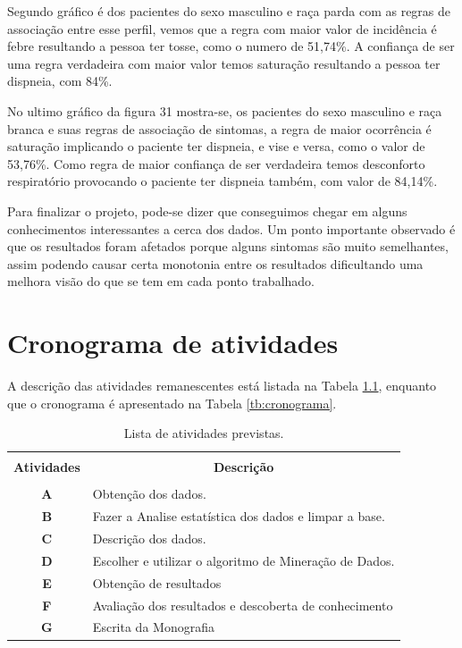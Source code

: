 \documentclass[tcc1]{uftex}
\begin{document}
    Segundo gráfico é dos pacientes do sexo masculino e raça parda com as regras de associação entre esse perfil, vemos que a regra com maior valor de incidência é febre resultando a pessoa ter tosse, como o numero de 51,74\%. A confiança de ser uma regra verdadeira com maior valor temos saturação resultando a pessoa ter dispneia, com 84\%.
    
    No ultimo gráfico da figura 31 mostra-se, os pacientes do sexo masculino e raça branca e suas regras de associação de sintomas, a regra de maior ocorrência é saturação implicando o paciente ter dispneia, e vise e versa, como o valor de 53,76\%. Como regra de maior confiança de ser verdadeira temos desconforto respiratório provocando o paciente ter dispneia também, com valor de 84,14\%.
    
    
    
    Para finalizar o projeto, pode-se dizer que conseguimos chegar em alguns conhecimentos interessantes a cerca dos dados. Um ponto importante observado é que os resultados foram afetados porque alguns sintomas são muito semelhantes, assim podendo causar certa monotonia entre os resultados dificultando uma melhora visão do que se tem em cada ponto trabalhado.

\chapter{Cronograma de atividades}
A descrição das atividades remanescentes está listada na Tabela \ref{tb:atividades}, enquanto que o cronograma é apresentado na Tabela \ref{tb:cronograma}.


\begin{table}[!h]
  \centering
  \caption{Lista de atividades previstas.}\label{tb:atividades}
  \begin{tabular}{cp{9.4cm}}
    \hline \hline &\\[-0.4cm]
    {\bf Atividades} & \multicolumn{1}{c}{\bf Descrição} \\
    \hline
    &\\[-0.4cm]
    \textbf{A} & Obtenção dos dados.\\[0.2cm]
    \textbf{B} & Fazer a Analise estatística dos dados e limpar a base.\\[0.2cm]
    \textbf{C} & Descrição dos dados.\\[0.2cm]
    \textbf{D} & Escolher e utilizar o algoritmo de Mineração de Dados.\\[0.2cm]
    \textbf{E} & Obtenção de resultados\\[0.2cm]
    \textbf{F} &  Avaliação dos resultados e descoberta de conhecimento\\[0.2cm]
    \textbf{G} &  Escrita da Monografia\\[0.2cm]
    \hline \hline
  \end{tabular}
\end{table}
\end{document}
